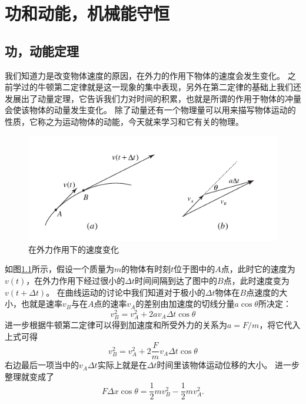 
\chapter{功和动能，机械能守恒}
\section{功，动能定理}

我们知道力是改变物体速度的原因，在外力的作用下物体的速度会发生变化。
之前学过的牛顿第二定律就是这一现象的集中表现，另外在第二定律的基础上我们还发展出了动量定理，它告诉我们力对时间的积累，也就是所谓的作用于物体的冲量会使该物体的动量发生变化。
除了动量还有一个物理量可以用来描写物体运动的性质，它称之为运动物体的动能，今天就来学习和它有关的物理。


\begin{figure}[htbp]
\begin{center}
\includegraphics{images/energy-1.pdf}

\caption{在外力作用下的速度变化}
\label{fig: 动能定理：外力作用下的速度变化}
\end{center}
\end{figure}

如图\ref{fig: 动能定理：外力作用下的速度变化}所示，假设一个质量为$m$的物体有时刻$t$位于图中的$A$点，此时它的速度为$v(t)$，在外力作用下经过很小的$\Delta t$时间间隔到达了图中的$B$点，此时速度变为$v(t+\Delta t)$。
在曲线运动的讨论中我们知道对于极小的$\Delta t$物体在$B$点速度的大小，也就是速率$v_B$与在$A$点的速率$v_A$的差别由加速度的切线分量$a\cos\theta$所决定：
\begin{equation}
v_B^2 = v_A^2 + 2av_A\Delta t  \cos\theta
\end{equation}
进一步根据牛顿第二定律可以得到加速度和所受外力的关系为$a=F/m$，将它代入上式可得
\begin{equation}
v_B^2 = v_A^2 + 2\frac{F}{m}v_A\Delta t  \cos\theta
\end{equation}
右边最后一项当中的$v_A\Delta t$实际上就是在$\Delta t $时间里该物体运动位移的大小。
进一步整理就变成了
\begin{equation}\label{eqn: 动能定理}
F\Delta x\cos\theta = \frac{1}{2}mv_B^2-\frac{1}{2}mv_A^2.
\end{equation}

